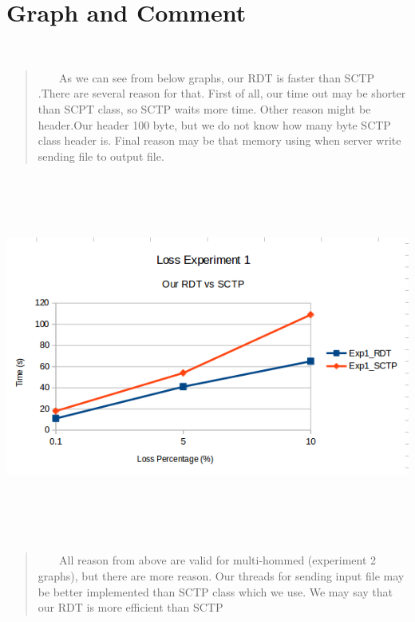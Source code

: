 \documentclass[12pt]{article}
\begin{document}
\section*{Graph and Comment}
\
\
\begin{quote}
$\ \  \ \ \ \ \ $ As we can see from below graphs, our RDT is faster than SCTP .There are several reason for that. First of all, our time out may be shorter than SCPT class, so SCTP waits more time. Other reason might be header.Our header 100 byte, but we do not know how many byte SCTP class header is. Final reason may be that memory using when server write sending file to output file.
\end{quote}

\includegraphics[width = 180mm, height = 120mm]{LossExperiment1}


\begin{quote}
$\ \  \ \ \ \ \ $ All reason from above are valid for multi-hommed (experiment 2 graphs), but there are more reason. Our threads for sending input file may be better implemented than SCTP class which we use. We may say that our RDT is more efficient than SCTP
\end{quote}
\end{document}
